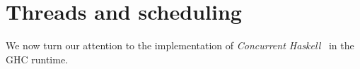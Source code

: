 \section{Threads and scheduling}

We now turn our attention to the implementation of \emph{Concurrent
Haskell}~\XXX{} in the GHC runtime.
